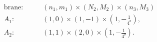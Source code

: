\begin{equation}
\begin{aligned}
\text{brane:}\qquad  & (n_1,m_1) \times (N_2,M_2) \times (n_3,M_3)\\
A_1: \qquad & (1,0)  \times (1,-1) \times (1, -\frac{1}{4^b}),\\
A_2: \qquad & (1,1)  \times (2,0) \times (1, -\frac{1}{4^b}).
\end{aligned}\label{EqbranesA1A2}
\end{equation}

